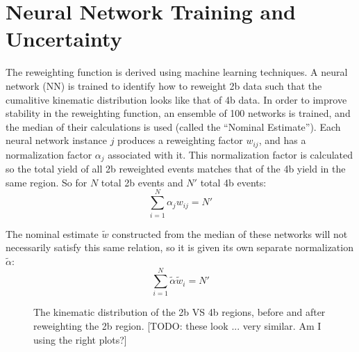 \section{Neural Network Training and Uncertainty}

    The reweighting function is derived using machine learning techniques.
    A neural network (NN) is trained to identify how to reweight 2b data such that the cumalitive kinematic distribution looks like that of 4b data.
    In order to improve stability in the reweighting function,
        an ensemble of 100 networks is trained, and the median of their calculations is used (called the ``Nominal Estimate'').
    Each neural network instance $j$ produces a reweighting factor $w_{ij}$, and has a normalization factor $\alpha_j$ associated with it.
    This normalization factor is calculated so the total yield of all 2b reweighted events matches that of the 4b yield in the same region.
    So for $N$ total 2b events and $N'$ total 4b events:
        \begin{equation}
        \sum_{i=1}^{N} \alpha_j w_{ij} = N'
        \end{equation}

    The nominal estimate $\tilde{w}$ constructed from the median of these networks will not necessarily satisfy this same relation,
        so it is given its own separate normalization $\tilde \alpha$:
        \begin{equation}
        \sum_{i=1}^{N} \tilde \alpha \tilde w_i = N'
        \end{equation}

    \begin{figure}[!htbp]
        \caption{
            The \mhh kinematic distribution of the 2b VS 4b regions, before and after reweighting the 2b region.
            [TODO: these look ... very similar. Am I using the right plots?]
        }
        \label{fig:data_mhh_reweight}
    \end{figure}

